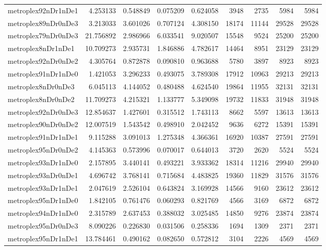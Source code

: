 \begin{longtable}{|l|r|r|r|r|r|r|r|r|}
metroplex92nDr1nDe1 & 4.253133 & 0.548849 & 0.075209 & 0.624058 & 3948 & 2735 & 5984 & 5984 \\
metroplex89nDr0nDe3 & 3.213033 & 3.601026 & 0.707124 & 4.308150 & 18174 & 11144 & 29528 & 29528 \\
metroplex79nDr0nDe3 & 21.756892 & 2.986966 & 6.033541 & 9.020507 & 15548 & 9524 & 25200 & 25200 \\
metroplex8nDr1nDe1 & 10.709273 & 2.935731 & 1.846886 & 4.782617 & 14464 & 8951 & 23129 & 23129 \\
metroplex92nDr0nDe2 & 4.305764 & 0.872878 & 0.090810 & 0.963688 & 5780 & 3897 & 8923 & 8923 \\
metroplex91nDr1nDe0 & 1.421053 & 3.296233 & 0.493075 & 3.789308 & 17912 & 10963 & 29213 & 29213 \\
metroplex8nDr0nDe3 & 6.045113 & 4.144052 & 0.480488 & 4.624540 & 19864 & 11955 & 32131 & 32131 \\
metroplex8nDr0nDe2 & 11.709273 & 4.215321 & 1.133777 & 5.349098 & 19732 & 11833 & 31948 & 31948 \\
metroplex92nDr0nDe3 & 12.854637 & 1.427601 & 0.315512 & 1.743113 & 8662 & 5597 & 13613 & 13613 \\
metroplex90nDr0nDe2 & 12.007519 & 1.543542 & 0.498910 & 2.042452 & 9636 & 6272 & 15391 & 15391 \\
metroplex91nDr1nDe1 & 9.115288 & 3.091013 & 1.275348 & 4.366361 & 16920 & 10387 & 27591 & 27591 \\
metroplex95nDr0nDe2 & 4.145363 & 0.573996 & 0.070017 & 0.644013 & 3720 & 2620 & 5524 & 5524 \\
metroplex93nDr1nDe0 & 2.157895 & 3.440141 & 0.493221 & 3.933362 & 18314 & 11216 & 29940 & 29940 \\
metroplex93nDr0nDe1 & 4.696742 & 3.768141 & 0.715684 & 4.483825 & 19360 & 11829 & 31576 & 31576 \\
metroplex93nDr1nDe1 & 2.047619 & 2.526104 & 0.643824 & 3.169928 & 14566 & 9160 & 23612 & 23612 \\
metroplex95nDr1nDe0 & 1.842105 & 0.761476 & 0.060293 & 0.821769 & 4566 & 3169 & 6872 & 6872 \\
metroplex94nDr1nDe0 & 2.315789 & 2.637453 & 0.388032 & 3.025485 & 14850 & 9276 & 23874 & 23874 \\
metroplex95nDr0nDe3 & 8.090226 & 0.226830 & 0.031506 & 0.258336 & 1694 & 1309 & 2371 & 2371 \\
metroplex95nDr1nDe1 & 13.784461 & 0.490162 & 0.082650 & 0.572812 & 3104 & 2226 & 4569 & 4569 \\

\end{longtable}
